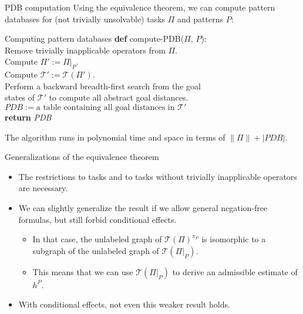 \documentclass{gkibeamer}
\begin{document}
\begin{frame}{PDB computation}
  Using the equivalence theorem, we can compute pattern databases
  for (not trivially unsolvable) {\sasplus} tasks $\Pi$ and patterns $P$:
  
  \begin{block}{Computing pattern databases}
    \textbf{def} compute-PDB($\Pi$, $P$): \\
    {}\qquad Remove trivially inapplicable operators from $\Pi$. \\
    {}\qquad Compute $\Pi' := \Pi|_P$. \\
    {}\qquad Compute $\mathcal T' := \mathcal T(\Pi')$. \\
    {}\qquad Perform a backward breadth-first search from the goal \\
    {}\qquad\qquad states of $\mathcal T'$ to compute all abstract
    goal distances. \\
    {}\qquad $\textit{PDB} := \text{a table containing all
    goal distances in~} \mathcal T'$ \\
    {}\qquad\textbf{return} \textit{PDB}
  \end{block}
  
  The algorithm runs \alert{in polynomial time and space} in terms of
  $\|\Pi\| + |\textit{PDB}|$.
\end{frame}

\begin{frame}{Generalizations of the equivalence theorem}
  \begin{itemize}
  \item The restrictions to {\sasplus} tasks and to tasks without
    trivially inapplicable operators are necessary.
  \item We can slightly generalize the result if we allow general
    negation-free formulas, but still forbid conditional effects.
    \begin{itemize}
    \item In that case, the unlabeled graph of $\mathcal
      T(\Pi)^{\pi_P}$ is isomorphic to a subgraph of the unlabeled
      graph of $\mathcal T(\Pi|_P)$.
    \item This means that we can use $\mathcal T(\Pi|_P)$ to derive
      an admissible estimate of $h^P$.
    \end{itemize}
  \item With conditional effects, not even this weaker result holds.
  \end{itemize}
\end{frame}
\end{document}
